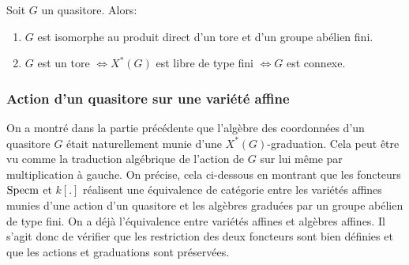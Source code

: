 \begin{cor}
Soit $G$ un quasitore. Alors:
\begin{enumerate}
\item $G$ est isomorphe au produit direct d'un tore et d'un groupe abélien fini.
\item $G$ est un tore $\iff X^*(G)$ est libre de type fini $\iff G$ est connexe.
\end{enumerate}
\end{cor}

\subsubsection{Action d'un quasitore sur une variété affine}

On a montré dans la partie précédente que l'algèbre des coordonnées d'un quasitore $G$ était naturellement munie d'une $X^*(G)$-graduation. Cela peut être vu comme la traduction algébrique de l'action de $G$ sur lui même par multiplication à gauche. On précise, cela ci-dessous en montrant que les foncteurs $\operatorname{Specm}$ et $k[.]$ réalisent une équivalence de catégorie entre les variétés affines munies d'une action d'un quasitore et les algèbres graduées par un groupe abélien de type fini. On a déjà l'équivalence entre variétés affines et algèbres affines. Il s'agit donc de vérifier que les restriction des deux foncteurs sont bien définies et que les actions et graduations sont préservées.

